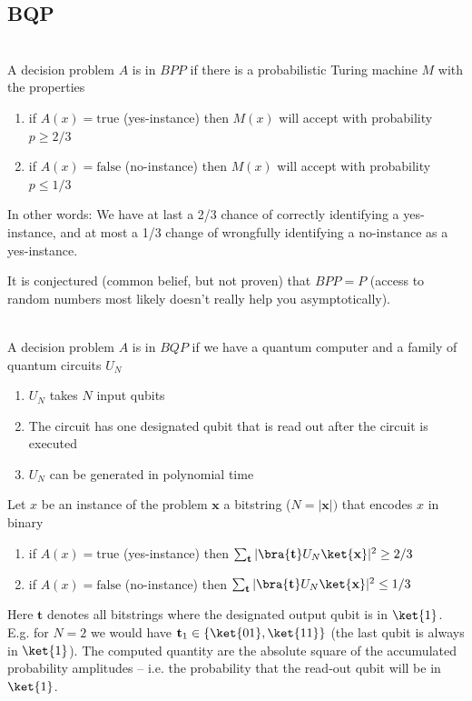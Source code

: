 \subsection{BQP}

\begin{def*}\phantom{...}\\
    A decision problem $A$ is in $BPP$ if there is a probabilistic Turing machine $M$ with the properties
    \begin{enumerate}
        \item if $A(x)=\text{true}$ (yes-instance) then $M(x)$ will accept with probability $p \geq 2/3$
        \item if $A(x)=\text{false}$ (no-instance) then $M(x)$ will accept with probability $p \leq 1/3$
    \end{enumerate}
    In other words: We have at last a 2/3 chance of correctly identifying a yes-instance, and at most a 1/3 change of wrongfully identifying a no-instance as a yes-instance.
\end{def*}
It is conjectured (common belief, but not proven) that $BPP = P$ (access to random numbers most likely doesn't really help you asymptotically).

\begin{def*}\phantom{...}\\
    A decision problem $A$ is in $BQP$ if we have a quantum computer and a family of quantum circuits $U_N$
    \begin{enumerate}
        \item $U_N$ takes $N$ input qubits
        \item The circuit has one designated qubit that is read out after the circuit is executed
        \item $U_N$ can be generated in polynomial time 
    \end{enumerate}
    Let $x$ be an instance of the problem  $\mathbf{x}$ a bitstring ($N=|\mathbf{x}|)$ that encodes $x$ in binary
    \begin{enumerate}
        \item if $A(x)=\text{true}$ (yes-instance) then $\sum_{\mathbf{t}}|\bra{\mathbf{t}}U_N\ket{\mathbf{x}}|^2 \geq 2/3$ 
        \item if $A(x)=\text{false}$ (no-instance) then $\sum_{\mathbf{t}}|\bra{\mathbf{t}}U_N\ket{\mathbf{x}}|^2\leq 1/3$
    \end{enumerate}
    Here $\mathbf{t}$ denotes all bitstrings where the designated output qubit is in $\ket{1}$. E.g. for $N=2$ we would have
    $\mathbf{t}_1 \in \left\{\ket{01}, \ket{11}\right\}$ (the last qubit is always in $\ket{1}$). The computed quantity are the absolute square of the accumulated probability amplitudes -- i.e. the probability that the read-out qubit will be in $\ket{1}$. 
\end{def*}


